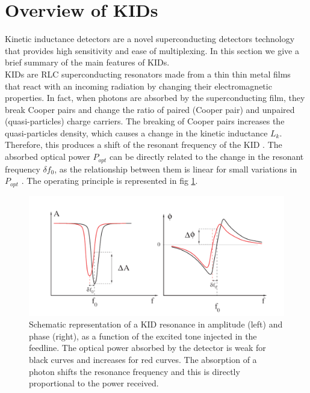 \section{Overview of KIDs}
\label{sec2}

Kinetic inductance detectors are a novel superconducting detectors technology that provides high sensitivity and ease of multiplexing. In this section we give a brief summary of the main features of KIDs.\\
KIDs are RLC superconducting resonators made from a thin thin metal films that react with an incoming radiation by changing their electromagnetic properties. In fact, when photons are absorbed by the superconducting film, they break Cooper pairs and change the ratio of paired (Cooper pair) and unpaired (quasi-particles) charge carriers. The breaking of Cooper pairs increases the quasi-particles density, which causes a change in the kinetic inductance $L_{k}$. Therefore, this produces a shift of the resonant frequency of the KID \citep{2013A&A...551L..12C}. The absorbed optical power $P_{opt}$ can be directly related to the change in the resonant frequency $\delta f_{0}$, as the relationship between them is linear for small variations in $P_{opt}$ \citep{2010ApPhL..96z3511S}. The operating principle is represented in fig \ref{resonance}.\\

\begin{figure}[h]
\center
	\includegraphics[scale=0.35]{resonance.png}
	\caption{Schematic representation of a KID resonance in amplitude (left) and phase (right), as a function of the excited tone injected in the feedline. The optical power absorbed by the detector is weak for black curves and increases for red curves. The absorption of a photon shifts the resonance frequency and this is directly proportional to the power received.}
	\label{resonance}
\end{figure}

